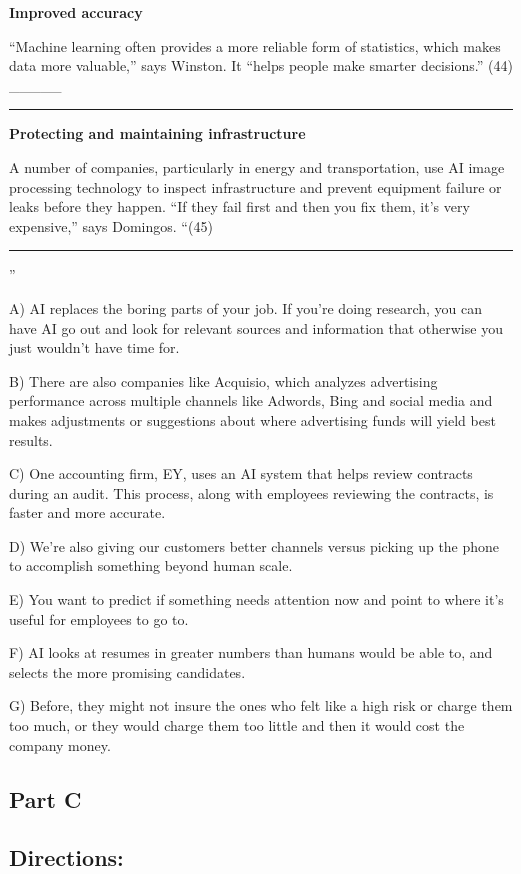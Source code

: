 \documentclass[UTF8,11pt]{ctexart}
\begin{document}
\textbf{Improved accuracy}


“Machine learning often provides a more reliable form of statistics, which makes data more valuable,” says Winston. It “helps people make smarter decisions.” (44) \_\_\_\_\_ \par\noindent\rule{.95\linewidth}{.4pt}\par


\textbf{Protecting and maintaining infrastructure}


A number of companies, particularly in energy and transportation, use AI image processing technology to inspect infrastructure and prevent equipment failure or leaks before they happen. “If they fail first and then you fix them, it’s very expensive,” says Domingos. “(45)\par\noindent\rule{.95\linewidth}{.4pt}\par ”


A) AI replaces the boring parts of your job. If you’re doing research, you can have AI go out and look for relevant sources and information that otherwise you just wouldn’t have time for.


B) There are also companies like Acquisio, which analyzes advertising performance across multiple channels like Adwords, Bing and social media and makes adjustments or suggestions about where advertising funds will yield best results.


C) One accounting firm, EY, uses an AI system that helps review contracts during an audit. This process, along with employees reviewing the contracts, is faster and more accurate.


D) We’re also giving our customers better channels versus picking up the phone to accomplish something beyond human scale.


E) You want to predict if something needs attention now and point to where it’s useful for employees to go to.


F) AI looks at resumes in greater numbers than humans would be able to, and selects the more promising candidates.


G) Before, they might not insure the ones who felt like a high risk or charge them too much, or they would charge them too little and then it would cost the company money.


\subsection*{\textbf{Part C}}


\subsection*{\textbf{Directions:}}
\end{document}
